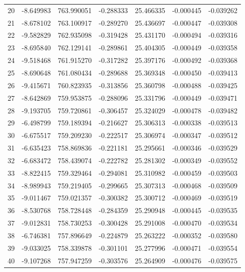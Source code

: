 \begin{tabular}{rrrrrrr}
  20 &  -8.649983 &  763.990051 & -0.288333 &   25.466335 &   -0.000445 & -0.039262 \\
  21 &  -8.678102 &  763.100917 & -0.289270 &   25.436697 &   -0.000447 & -0.039308 \\
  22 &  -9.582829 &  762.935098 & -0.319428 &   25.431170 &   -0.000494 & -0.039316 \\
  23 &  -8.695840 &  762.129141 & -0.289861 &   25.404305 &   -0.000449 & -0.039358 \\
  24 &  -9.518468 &  761.915270 & -0.317282 &   25.397176 &   -0.000492 & -0.039368 \\
  25 &  -8.690648 &  761.080434 & -0.289688 &   25.369348 &   -0.000450 & -0.039413 \\
  26 &  -9.415671 &  760.823935 & -0.313856 &   25.360798 &   -0.000488 & -0.039425 \\
  27 &  -8.642869 &  759.953875 & -0.288096 &   25.331796 &   -0.000449 & -0.039471 \\
  28 &  -9.193705 &  759.720861 & -0.306457 &   25.324029 &   -0.000478 & -0.039482 \\
  29 &  -6.498799 &  759.189394 & -0.216627 &   25.306313 &   -0.000338 & -0.039513 \\
  30 &  -6.675517 &  759.209230 & -0.222517 &   25.306974 &   -0.000347 & -0.039512 \\
  31 &  -6.635423 &  758.869836 & -0.221181 &   25.295661 &   -0.000346 & -0.039529 \\
  32 &  -6.683472 &  758.439074 & -0.222782 &   25.281302 &   -0.000349 & -0.039552 \\
  33 &  -8.822415 &  759.329464 & -0.294081 &   25.310982 &   -0.000459 & -0.039503 \\
  34 &  -8.989943 &  759.219405 & -0.299665 &   25.307313 &   -0.000468 & -0.039509 \\
  35 &  -9.011467 &  759.021357 & -0.300382 &   25.300712 &   -0.000469 & -0.039519 \\
  36 &  -8.530768 &  758.728448 & -0.284359 &   25.290948 &   -0.000445 & -0.039535 \\
  37 &  -9.012831 &  758.730253 & -0.300428 &   25.291008 &   -0.000470 & -0.039534 \\
  38 &  -6.746381 &  757.896649 & -0.224879 &   25.263222 &   -0.000352 & -0.039580 \\
  39 &  -9.033025 &  758.339878 & -0.301101 &   25.277996 &   -0.000471 & -0.039554 \\
  40 &  -9.107268 &  757.947259 & -0.303576 &   25.264909 &   -0.000476 & -0.039575 \\

\end{tabular}
